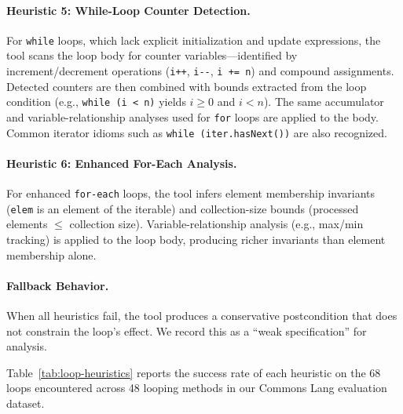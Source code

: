 \documentclass[11pt]{article}
\begin{document}
\paragraph{Heuristic 5: While-Loop Counter Detection.}
For \texttt{while} loops, which lack explicit initialization and update expressions, the tool scans the loop body for counter variables---identified by increment/decrement operations (\texttt{i++}, \texttt{i-{}-}, \texttt{i += n}) and compound assignments. Detected counters are then combined with bounds extracted from the loop condition (e.g., \texttt{while (i < n)} yields $i \geq 0$ and $i < n$). The same accumulator and variable-relationship analyses used for \texttt{for} loops are applied to the body. Common iterator idioms such as \texttt{while (iter.hasNext())} are also recognized.

\paragraph{Heuristic 6: Enhanced For-Each Analysis.}
For enhanced \texttt{for-each} loops, the tool infers element membership invariants (\texttt{elem} is an element of the iterable) and collection-size bounds (processed elements $\leq$ collection size). Variable-relationship analysis (e.g., max/min tracking) is applied to the loop body, producing richer invariants than element membership alone.

\paragraph{Fallback Behavior.}
When all heuristics fail, the tool produces a conservative postcondition that does not constrain the loop's effect. We record this as a ``weak specification'' for analysis.

Table~\ref{tab:loop-heuristics} reports the success rate of each heuristic on the 68 loops encountered across 48 looping methods in our Commons Lang evaluation dataset.
\end{document}
